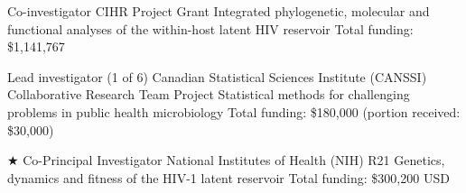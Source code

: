 {Co-investigator}
{CIHR Project Grant}  %
{Integrated phylogenetic, molecular and functional analyses of the within-host latent HIV reservoir}
{Total funding: \$1,141,767}
{}

{Lead investigator (1 of 6)}
{Canadian Statistical Sciences Institute (CANSSI) Collaborative Research Team Project}
{Statistical   methods   for   challenging   problems   in   public   health   microbiology}
{Total funding: \$180,000 (portion received: \$30,000)}
{}



{$\bigstar$ Co-Principal Investigator}
{National Institutes of Health (NIH) R21}  %
{Genetics, dynamics and fitness of the HIV-1 latent reservoir}
{Total funding: \$300,200 USD}
{}


